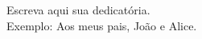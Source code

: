 \begin{dedicatoria}
  \vspace*{\fill}
  \hspace{.5\textwidth}%
  \begin{minipage}{.5\textwidth}
    \raggedright
    Escreva aqui sua dedicatória.\\
    Exemplo: Aos meus pais, João e Alice.
  \end{minipage}
\end{dedicatoria}

